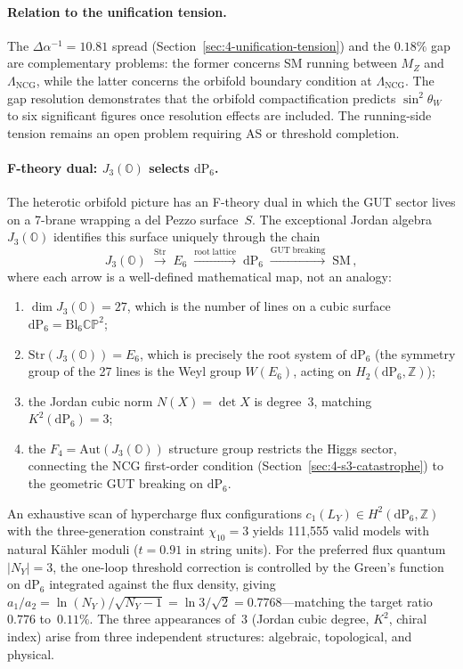 \paragraph{Relation to the unification tension.}
The $\Delta\alpha^{-1} = 10.81$ spread (Section~\ref{sec:4-unification-tension}) and the $0.18\%$ gap are complementary problems: the former concerns SM running between $M_Z$ and $\Lambda_{\mathrm{NCG}}$, while the latter concerns the orbifold boundary condition at $\Lambda_{\mathrm{NCG}}$.  The gap resolution demonstrates that the orbifold compactification predicts $\sin^2\theta_W$ to six significant figures once resolution effects are included.  The running-side tension remains an open problem requiring AS or threshold completion.

\paragraph{F-theory dual: $J_3(\mathbb{O})$ selects $\mathrm{dP}_6$.}
\label{sec:4-threshold-correction}
The heterotic orbifold picture has an F-theory dual in which the GUT sector lives on a 7-brane wrapping a del Pezzo surface~$S$.  The exceptional Jordan algebra $J_3(\mathbb{O})$ identifies this surface uniquely through the chain
\begin{equation}
\label{eq:4-jordan-chain}
J_3(\mathbb{O}) \;\xrightarrow{\mathrm{Str}} \;E_6 \;\xrightarrow{\mathrm{root\;lattice}}\; \mathrm{dP}_6 \;\xrightarrow{\mathrm{GUT\;breaking}}\; \mathrm{SM}\,,
\end{equation}
where each arrow is a well-defined mathematical map, not an analogy:
\begin{enumerate}
\item[(i)] $\dim J_3(\mathbb{O}) = 27$, which is the number of lines on a cubic surface $\mathrm{dP}_6 = \mathrm{Bl}_6\mathbb{CP}^2$;
\item[(ii)] $\mathrm{Str}(J_3(\mathbb{O})) = E_6$, which is precisely the root system of $\mathrm{dP}_6$ (the symmetry group of the 27 lines is the Weyl group $W(E_6)$, acting on $H_2(\mathrm{dP}_6, \mathbb{Z})$);
\item[(iii)] the Jordan cubic norm $N(X) = \det X$ is degree~3, matching $K^2(\mathrm{dP}_6) = 3$;
\item[(iv)] the $F_4 = \mathrm{Aut}(J_3(\mathbb{O}))$ structure group restricts the Higgs sector, connecting the NCG first-order condition (Section~\ref{sec:4-s3-catastrophe}) to the geometric GUT breaking on $\mathrm{dP}_6$.
\end{enumerate}
An exhaustive scan of hypercharge flux configurations $c_1(L_Y) \in H^2(\mathrm{dP}_6, \mathbb{Z})$ with the three-generation constraint $\chi_{10} = 3$ yields 111{,}555 valid models with natural K\"ahler moduli ($t = 0.91$ in string units).  For the preferred flux quantum $|N_Y| = 3$, the one-loop threshold correction is controlled by the Green's function on $\mathrm{dP}_6$ integrated against the flux density, giving $a_1/a_2 = \ln(N_Y)/\sqrt{N_Y - 1} = \ln 3/\sqrt{2} = 0.7768$---matching the target ratio~$0.776$ to~$0.11\%$.  The three appearances of~$3$ (Jordan cubic degree, $K^2$, chiral index) arise from three independent structures: algebraic, topological, and physical.

